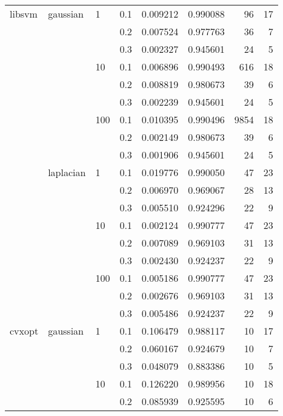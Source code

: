 \begin{table}[H]
\begin{tabular}{llllrrrr}
libsvm & gaussian & 1   & 0.1 &   0.009212 &  0.990088 &      96 &    17 \\
       &           &     & 0.2 &   0.007524 &  0.977763 &      36 &     7 \\
       &           &     & 0.3 &   0.002327 &  0.945601 &      24 &     5 \\
       &           & 10  & 0.1 &   0.006896 &  0.990493 &     616 &    18 \\
       &           &     & 0.2 &   0.008819 &  0.980673 &      39 &     6 \\
       &           &     & 0.3 &   0.002239 &  0.945601 &      24 &     5 \\
       &           & 100 & 0.1 &   0.010395 &  0.990496 &    9854 &    18 \\
       &           &     & 0.2 &   0.002149 &  0.980673 &      39 &     6 \\
       &           &     & 0.3 &   0.001906 &  0.945601 &      24 &     5 \\
       & laplacian & 1   & 0.1 &   0.019776 &  0.990050 &      47 &    23 \\
       &           &     & 0.2 &   0.006970 &  0.969067 &      28 &    13 \\
       &           &     & 0.3 &   0.005510 &  0.924296 &      22 &     9 \\
       &           & 10  & 0.1 &   0.002124 &  0.990777 &      47 &    23 \\
       &           &     & 0.2 &   0.007089 &  0.969103 &      31 &    13 \\
       &           &     & 0.3 &   0.002430 &  0.924237 &      22 &     9 \\
       &           & 100 & 0.1 &   0.005186 &  0.990777 &      47 &    23 \\
       &           &     & 0.2 &   0.002676 &  0.969103 &      31 &    13 \\
       &           &     & 0.3 &   0.005486 &  0.924237 &      22 &     9 \\
cvxopt & gaussian & 1   & 0.1 &   0.106479 &  0.988117 &      10 &    17 \\
       &           &     & 0.2 &   0.060167 &  0.924679 &      10 &     7 \\
       &           &     & 0.3 &   0.048079 &  0.883386 &      10 &     5 \\
       &           & 10  & 0.1 &   0.126220 &  0.989956 &      10 &    18 \\
       &           &     & 0.2 &   0.085939 &  0.925595 &      10 &     6 \\

\end{tabular}
\end{table}
